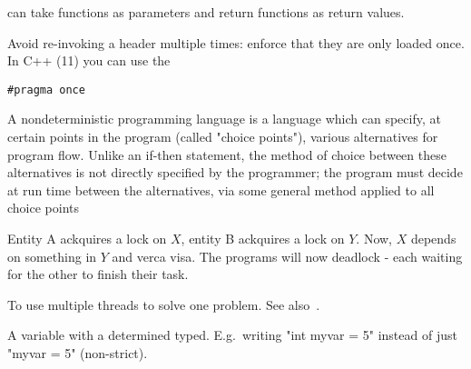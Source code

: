 \begin{definition}
    can take functions as parameters and return functions as return values.

\end{definition}

\begin{definition}
    Avoid re-invoking a header multiple times: enforce that they are only 
    loaded once. In C++ (11) you can use the 
    \begin{verbatim}#pragma once\end{verbatim}
\end{definition}

\begin{definition}\label{nondeterministicprog}
    A nondeterministic programming language is a language which can specify, at
    certain points in the program (called "choice points"), various alternatives
    for program flow. Unlike an if-then statement, the method of choice between
    these alternatives is not directly specified by the programmer; the program
    must decide at run time between the alternatives, via some general method
    applied to all choice points

\end{definition}

\begin{definition}
    Entity A ackquires a lock on $X$, entity B ackquires a lock on $Y$.
    Now, $X$ depends on something in $Y$ and verca visa. The programs will
    now deadlock - each waiting for the other to finish their task.

\end{definition}

\begin{definition}[Parallelism]\label{parallelism}
    To use multiple threads to solve one problem. See
    also~.

\end{definition}


\begin{definition}
    A variable with a determined typed. E.g.\ writing "int myvar = 5" instead
    of just "myvar = 5" (non-strict).

\end{definition}
